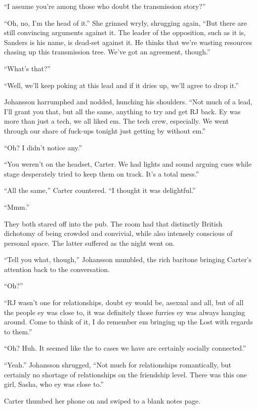 ``I assume you're among those who doubt the transmission story?''

``Oh, no, I'm the head of it.'' She grinned wryly, shrugging again, ``But there are still convincing arguments against it. The leader of the opposition, such as it is, Sanders is his name, is dead-set against it. He thinks that we're wasting resources chasing up this transmission tree. We've got an agreement, though.''

``What's that?''

``Well, we'll keep poking at this lead and if it dries up, we'll agree to drop it.''

Johansson harrumphed and nodded, hunching his shoulders. ``Not much of a lead, I'll grant you that, but all the same, anything to try and get RJ back. Ey was more than just a tech, we all liked em. The tech crew, especially. We went through our share of fuck-ups tonight just getting by without em.''

``Oh? I didn't notice any.''

``You weren't on the headset, Carter. We had lights and sound arguing cues while stage desperately tried to keep them on track. It's a total mess.''

``All the same,'' Carter countered. ``I thought it was delightful.''

``Mmm.''

They both stared off into the pub. The room had that distinctly British dichotomy of being crowded and convivial, while also intensely conscious of personal space. The latter suffered as the night went on.

``Tell you what, though,'' Johansson mumbled, the rich baritone bringing Carter's attention back to the conversation.

``Oh?''

``RJ wasn't one for relationships, doubt ey would be, asexual and all, but of all the people ey was close to, it was definitely those furries ey was always hanging around. Come to think of it, I do remember em bringing up the Lost with regards to them.''

``Oh? Huh. It seemed like the to cases we have are certainly socially connected.''

``Yeah.'' Johansson shrugged, ``Not much for relationships romantically, but certainly no shortage of relationships on the friendship level. There was this one girl, Sasha, who ey was close to.''

Carter thumbed her phone on and swiped to a blank notes page.

